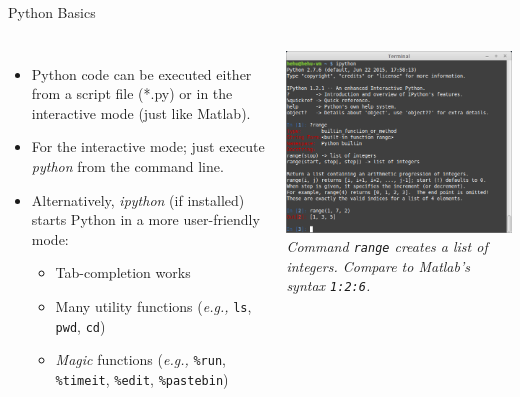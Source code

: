 \documentclass[10pt, aspectratio=169]{beamer} %
\begin{document}
\begin{frame}[fragile,allowframebreaks=0.8]
 {Python Basics}
\begin{columns}%
\begin{itemize}
\item Python code can be executed either from a script file (*.py) or in the
interactive mode (just like Matlab).
\item For the interactive mode; just execute \emph{python} from the command line.
\item Alternatively, \emph{ipython} (if installed) starts Python in a more
user-friendly mode:
\begin{itemize}
\item Tab-completion works
\item Many utility functions (\emph{e.g.,} \verb+ls+, \verb+pwd+, \verb+cd+)
\item \emph{Magic} functions (\emph{e.g.,} \verb+%run+, \verb+%timeit+, \verb+%edit+, \verb+%pastebin+)
\end{itemize}
\end{itemize}
\vspace*{-0.5cm}
\includegraphics[width=1\columnwidth]{ipythonRange.png}\\
\vspace*{0.25cm}
{\small\it
Command
\verb+range+ creates a list of integers. Compare to Matlab's
syntax \verb+1:2:6+.
}
\end{columns}
\end{frame}
\end{document}
